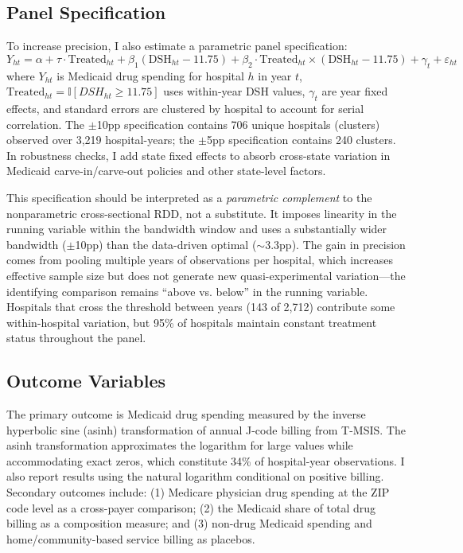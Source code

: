 \documentclass[12pt]{article}
\begin{document}
\subsection{Panel Specification}

To increase precision, I also estimate a parametric panel specification:
\begin{equation}
Y_{ht} = \alpha + \tau \cdot \text{Treated}_{ht} + \beta_1 (\text{DSH}_{ht} - 11.75) + \beta_2 \cdot \text{Treated}_{ht} \times (\text{DSH}_{ht} - 11.75) + \gamma_t + \varepsilon_{ht}
\label{eq:panel}
\end{equation}
where $Y_{ht}$ is Medicaid drug spending for hospital $h$ in year $t$, $\text{Treated}_{ht} = \mathbb{I}[DSH_{ht} \geq 11.75]$ uses within-year DSH values, $\gamma_t$ are year fixed effects, and standard errors are clustered by hospital to account for serial correlation. The $\pm$10pp specification contains 706 unique hospitals (clusters) observed over 3,219 hospital-years; the $\pm$5pp specification contains 240 clusters. In robustness checks, I add state fixed effects to absorb cross-state variation in Medicaid carve-in/carve-out policies and other state-level factors.

This specification should be interpreted as a \textit{parametric complement} to the nonparametric cross-sectional RDD, not a substitute. It imposes linearity in the running variable within the bandwidth window and uses a substantially wider bandwidth ($\pm$10pp) than the data-driven optimal ($\sim$3.3pp). The gain in precision comes from pooling multiple years of observations per hospital, which increases effective sample size but does not generate new quasi-experimental variation---the identifying comparison remains ``above vs. below'' in the running variable. Hospitals that cross the threshold between years (143 of 2,712) contribute some within-hospital variation, but 95\% of hospitals maintain constant treatment status throughout the panel.

\subsection{Outcome Variables}

The primary outcome is Medicaid drug spending measured by the inverse hyperbolic sine (asinh) transformation of annual J-code billing from T-MSIS. The asinh transformation approximates the logarithm for large values while accommodating exact zeros, which constitute 34\% of hospital-year observations. I also report results using the natural logarithm conditional on positive billing. Secondary outcomes include: (1) Medicare physician drug spending at the ZIP code level as a cross-payer comparison; (2) the Medicaid share of total drug billing as a composition measure; and (3) non-drug Medicaid spending and home/community-based service billing as placebos.
\end{document}
